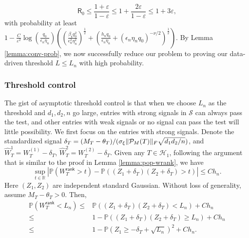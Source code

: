 \documentclass[12pt]{article}
\newcommand{\abs}[1]{\left\lvert#1\right\rvert}
\newcommand{\PP}{\mathbb{P}}
\newcommand{\R}{\mathbb{R}}
\newcommand{\cH}{\mathcal{H}}
\newcommand{\cS}{\mathcal{S}}
\def\calP{{\mathcal P}}
\def\PP{{\mathbb P}}
\newcommand{\sfR}{{\mathsf{R}}}
\theoremstyle{plain}
\begin{document}
\begin{equation*}
     \sfR_0\le \frac{1+\varepsilon}{1-\varepsilon}\le 1+\frac{2\varepsilon}{1-\varepsilon}\le 1+3\varepsilon,
\end{equation*}
with probability at least $1-\frac{C}{\varepsilon^2} \log(\frac{q_0 }{\epsilon_n \eta_n}) \left( \left(\frac{\beta_{\mathsf{s}} q_0^2 }{ \epsilon_n^2\eta_n^2}\right)^{\frac{1}{2}} + \left(\frac{h_n q_0}{\epsilon_n \eta_n}+(\epsilon_n\eta_n q_0)^{-\nu/2} \right)^{\frac{1}{2}}\right) $. 
By Lemma \ref{lemma:conv-prob}, we now successfully reduce our problem to proving our data-driven threshold $L\le L_n$ with high probability.

\subsubsection{ Threshold control}\label{sec:prof-thres}
 The gist of asymptotic threshold control is that when we choose $L_n$ as the threshold and $d_1,d_2,n$ go large, entries with strong signals in $\cS$ can always pass the test, and other entries with weak signals or no signal can pass the test will little possibility. We first focus on the entries with strong signals. Denote the standardized signal $\delta_T=(M_T-\theta_T)/({\sigma}_{\xi}\|\calP_M(T)\|_{\rm F}\sqrt{d_1d_2/n} )$, and $\widehat{W}^1_T= W^{(1)}_T- \delta_T$, $\widehat{W}^2_T= W^{(2)}_T- \delta_T$. Given any $T\in\cH_1$, following the argument that is similar to the proof in Lemma \ref{lemma:pop-wrank}, we have 
 \begin{equation*}
    \sup_{t\in \R}\abs{ \PP(W_T^\mathsf{rank}>t )- \PP\left( (Z_1+\delta_T)(Z_2+\delta_T)>t \right) }\le C h_n.
 \end{equation*}
Here $(Z_1,Z_2)$ are independent standard Gaussian. Without loss of generality, assume $M_T-\theta_T>0$. Then, 
 \begin{equation*}
\begin{aligned}
\PP(W_T^\mathsf{rank}< L_n ) \le &\PP\left( (Z_1+\delta_T)(Z_2+\delta_T)< L_n \right) +C h_n \\
\le & 1- \PP\left( (Z_1+\delta_T)(Z_2+\delta_T) \ge L_n \right) +C h_n \\
\le & 1- \PP\left( Z_1\ge -\delta_T+\sqrt{L_n} \right)^2 +C h_n.
\end{aligned}
 \end{equation*}
\end{document}

